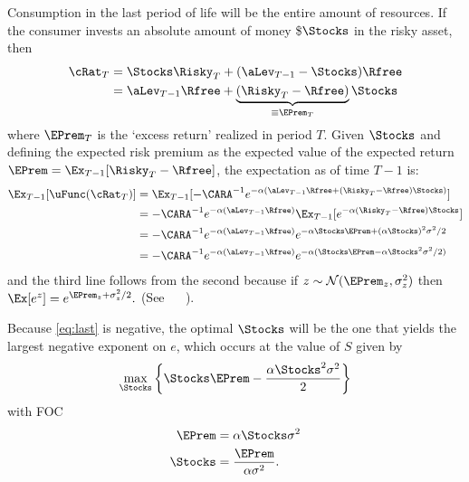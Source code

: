 Consumption in the last period of life will be the entire amount
of resources.  If the consumer invests an absolute amount of money \$$\Stocks$ in the risky asset, then
\begin{equation*}\begin{gathered}\begin{aligned}
        \cRat_{T} & =  \Stocks \Risky_{T}+( \aLev_{T-1}-\Stocks)\Rfree  \\
         & =   \aLev_{T-1}\Rfree + \underbrace{(\Risky_{T}-\Rfree)}_{\equiv \EPrem_{T}}\Stocks
\end{aligned}\end{gathered}\end{equation*}
where $\EPrem_{T}$ is the `excess return' realized in period $T$.  Given
$\Stocks$ and defining the expected risk premium as the expected value of the expected return $\EPrem =
\Ex_{T-1}[\Risky_{T}-\Rfree]$, the expectation as of time $T-1$ is:
\begin{equation}\begin{gathered}\begin{aligned}
        \Ex_{T-1}[\uFunc(\cRat_{T})] & =  \Ex_{T-1}[-\CARA^{-1}e^{-\alpha( \aLev_{T-1}\Rfree+(\Risky_{T}-\Rfree)\Stocks)}] \notag
\\ & =  -\CARA^{-1}e^{-\alpha( \aLev_{T-1}\Rfree)} \Ex_{T-1}[e^{-\alpha(\Risky_{T}-\Rfree)\Stocks}]     %
\\ & =  -\CARA^{-1}e^{-\alpha( \aLev_{T-1}\Rfree)} e^{-\alpha\Stocks\EPrem+(\alpha\Stocks)^{2}\sigma^{2}/2}
\\ & =  -\CARA^{-1} e^{-\alpha( \aLev_{T-1}\Rfree)}
e^{-\alpha(\Stocks\EPrem-\alpha\Stocks^{2}\sigma^{2}/2)} \label{eq:last}
\end{aligned}\end{gathered}\end{equation}
and the third line follows from the second because if $z \sim \mathcal{N}(\EPrem_{z},\sigma_{z}^{2})$
then $\Ex[e^{z}] = e^{\EPrem_{z}+\sigma_{z}^{2}/2}.$  (See \MathFactsList~~ \ELogNorm).

Because \eqref{eq:last} is negative, the optimal $\Stocks$ will be the
one that yields the largest negative exponent on $e$, which occurs at the value of $S$
given by
\begin{equation}
\max_{\Stocks} \left\{ \Stocks \EPrem - \frac{\alpha \Stocks^{2} \sigma^{2}}{2} \right\}
\end{equation}
with FOC
\begin{equation}\begin{gathered}\begin{aligned}
        \EPrem & =  \alpha \Stocks \sigma^{2}  \\
        \Stocks & =  \frac{\EPrem}{\alpha \sigma^{2}}.
\end{aligned}\end{gathered}\end{equation}

